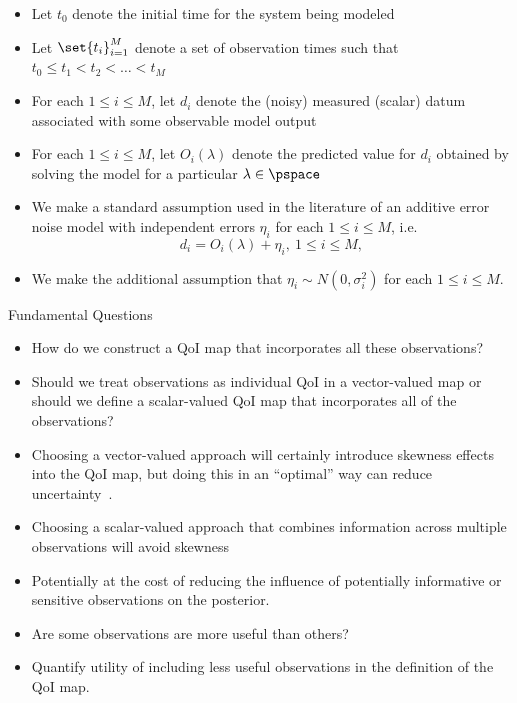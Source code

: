 \begin{frame}[t]
\begin{itemize}
	\item Let $t_0$ denote the initial time for the system being modeled 
	\item Let $\set{t_i}_{i=1}^M$ denote a set of observation times such that $t_0\leq t_1<t_2<\ldots<t_M$
	\item For each $1\leq i\leq M$, let $d_i$ denote the (noisy) measured (scalar) datum associated with some observable model output
	\item For each $1\leq i\leq M$, let $O_i(\lambda)$ denote the predicted value for $d_i$ obtained by solving the model for a particular $\lambda\in\pspace$
	\item We make a standard assumption used in the literature \cite{Smith, Barron, Silverman, Walpole} of an additive error noise model with independent errors $\eta_i$ for each $1\leq i\leq M$, i.e.
	\begin{equation}\label{eq:obs_data_error}
	d_i = O_i(\lambda) + \eta_i, \ 1\leq i\leq M,
\end{equation}
	\item We make the additional assumption that $\eta_i\sim N(0,\sigma_i^2)$ for each $1\leq i\leq M$.
\end{itemize}


\end{frame}


\begin{frame}[t]{Fundamental Questions}
\begin{itemize}
	\item How do we construct a QoI map that incorporates all these observations?
	\item Should we treat observations as individual QoI in a vector-valued map or should we define a scalar-valued QoI map that incorporates all of the observations?
	\item Choosing a vector-valued approach will certainly introduce skewness effects into the QoI map, but doing this in an ``optimal'' way can reduce uncertainty~\cite{Walsh}.
	\item Choosing a scalar-valued approach that combines information across multiple observations will avoid skewness 
	\item Potentially at the cost of reducing the influence of potentially informative or sensitive observations on the posterior.
	\item Are some observations are more useful than others?
	\item Quantify utility of including less useful observations in the definition of the QoI map.
\end{itemize}

\end{frame}


